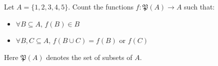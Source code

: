 Let $A = \{1, 2, 3, 4, 5\}$. Count the functions $f : \mathfrak{P}(A) \to A$ such that:
\begin{itemize}
\item $\forall B \subseteq A$, $f(B) \in B$
\item $\forall B, C \subseteq A$, $f(B \cup C) = f(B)$ or $f(C)$
\end{itemize}
Here $\mathfrak{P}(A)$ denotes the set of subsets of $A$.
